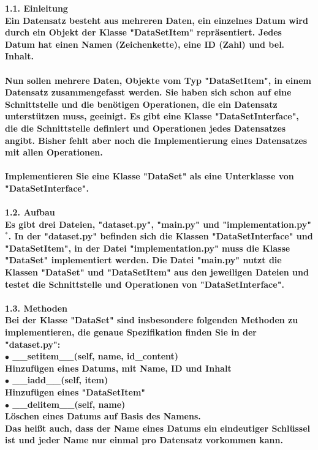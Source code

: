 \documentclass[]{article}
\begin{document}
\bf 1.1. Einleitung \normalfont\\[0.5cm]
Ein Datensatz besteht aus mehreren Daten, ein einzelnes Datum wird durch ein Objekt der Klasse "DataSetItem" repräsentiert.
Jedes Datum hat einen Namen (Zeichenkette), eine ID (Zahl) und bel. Inhalt.\\
\\
Nun sollen mehrere Daten, Objekte vom Typ "DataSetItem", in einem Datensatz zusammengefasst werden.
Sie haben sich schon auf eine Schnittstelle und die benötigen Operationen, die ein Datensatz unterstützen muss, geeinigt.
Es gibt eine Klasse "DataSetInterface", die die Schnittstelle definiert und Operationen jedes Datensatzes angibt.
Bisher fehlt aber noch die Implementierung eines Datensatzes mit allen Operationen.\\
\\
Implementieren Sie eine Klasse "DataSet" als eine Unterklasse von "DataSetInterface".\\
\\
\bf 1.2. Aufbau \normalfont\\[0.5cm]
Es gibt drei Dateien, "dataset.py", "main.py" und "implementation.py"$^*$.
In der "dataset.py" befinden sich die Klassen "DataSetInterface" und "DataSetItem",
in der Datei "implementation.py" muss die Klasse "DataSet" implementiert werden.
Die Datei "main.py" nutzt die Klassen "DataSet" und "DataSetItem" aus den jeweiligen Dateien und testet die Schnittstelle und Operationen von "DataSetInterface".\\
\\
\bf 1.3. Methoden \normalfont\\[0.5cm]
Bei der Klasse "DataSet" sind insbesondere folgenden Methoden zu implementieren, die genaue Spezifikation finden Sie in der "dataset.py":\\
$\bullet$ \_\_setitem\_\_(self, name, id\_content)\\
\hspace*{1cm} Hinzufügen eines Datums, mit Name, ID und Inhalt\\
$\bullet$ \_\_iadd\_\_(self, item)\\
\hspace*{1cm} Hinzufügen eines "DataSetItem"\\
$\bullet$ \_\_delitem\_\_(self, name)\\
\hspace*{1cm} Löschen eines Datums auf Basis des Namens.\\
\hspace*{1cm} Das heißt auch, dass der Name eines Datums ein eindeutiger Schlüssel ist und jeder Name nur einmal pro Datensatz vorkommen kann.\\
\end{document}

